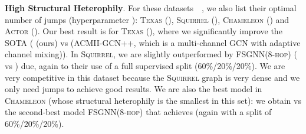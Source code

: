 \documentclass{article}
\theoremstyle{plain}
\theoremstyle{definition}
\begin{document}
\textbf{High Structural Heterophily}. For these datasets~\citep{penn94}~\citep{ogbn}, we also list their optimal number of jumps (hyperparameter ): \textsc{Texas} (), \textsc{Squirrel} (), \textsc{Chameleon} () and \textsc{Actor} (). Our best result is for \textsc{Texas} (), where we significantly improve the SOTA ( (ours) vs  (\textsc{ACMII-GCN++}, which is a multi-channel GCN with adaptive channel mixing)). In \textsc{Squirrel}, we are slightly outperformed by \textsc{FSGNN(8-hop)} ( vs ) due, again to their use of a full supervised split (60\%/20\%/20\%). We are very competitive in this dataset because the \textsc{Squirrel} graph is very dense and we only need  jumps to achieve good results. We are also the best model in \textsc{Chameleon} (whose structural heterophily is the smallest in this set): we obtain  vs the second-best model \textsc{FSGNN(8-hop)}  that achieves  (again with a split of 60\%/20\%/20\%). 
\end{document}
